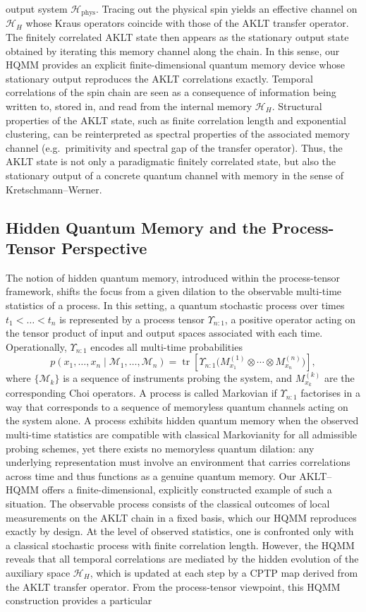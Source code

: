 \documentclass[11pt,a4paper]{article}
\begin{document}
output system $\mathcal{H}_\mathrm{phys}$. Tracing out the physical spin yields an effective channel on $\mathcal{H}_H$ whose Kraus operators coincide with those of the AKLT transfer operator. The finitely correlated AKLT state then appears as the stationary output state obtained by iterating this memory channel along the chain. In this sense, our HQMM provides an explicit finite-dimensional quantum memory device whose stationary output reproduces the AKLT correlations exactly. Temporal correlations of the spin chain are seen as a consequence of information being written to, stored in, and read from the internal memory $\mathcal{H}_H$. Structural properties of the AKLT state, such as finite correlation length and exponential clustering, can be reinterpreted as spectral properties of the associated memory channel (e.g.\ primitivity and spectral gap of the transfer operator). Thus, the AKLT state is not only a paradigmatic finitely correlated state, but also the stationary output of a concrete quantum channel with memory in the sense of Kretschmann--Werner. \subsection{Hidden Quantum Memory and the Process-Tensor Perspective} The notion of hidden quantum memory, introduced within the process-tensor framework, shifts the focus from a given dilation to the observable multi-time statistics of a process. In this setting, a quantum stochastic process over times $t_1 < \dots < t_n$ is represented by a process tensor $\Upsilon_{n:1}$, a positive operator acting on the tensor product of input and output spaces associated with each time. Operationally, $\Upsilon_{n:1}$ encodes all multi-time probabilities \[p(x_1,\dots,x_n \mid \mathcal{M}_1,\dots,\mathcal{M}_n)=\operatorname{tr}\!\left[  \Upsilon_{n:1}  \bigl(M^{(1)}_{x_1} \otimes \cdots \otimes M^{(n)}_{x_n}\bigr)\right],\] where $\{\mathcal{M}_k\}$ is a sequence of instruments probing the system, and $M^{(k)}_{x_k}$ are the corresponding Choi operators. A process is called Markovian if $\Upsilon_{n:1}$ factorises in a way that corresponds to a sequence of memoryless quantum channels acting on the system alone. A process exhibits hidden quantum memory when the observed multi-time statistics are compatible with classical Markovianity for all admissible probing schemes, yet there exists no memoryless quantum dilation: any underlying representation must involve an environment that carries correlations across time and thus functions as a genuine quantum memory. Our AKLT--HQMM offers a finite-dimensional, explicitly constructed example of such a situation. The observable process consists of the classical outcomes of local measurements on the AKLT chain in a fixed basis, which our HQMM reproduces exactly by design. At the level of observed statistics, one is confronted only with a classical stochastic process with finite correlation length. However, the HQMM reveals that all temporal correlations are mediated by the hidden evolution of the auxiliary space $\mathcal{H}_H$, which is updated at each step by a CPTP map derived from the AKLT transfer operator. From the process-tensor viewpoint, this HQMM construction provides a particular 
\end{document}
